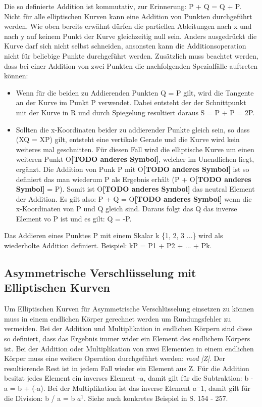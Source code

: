 		Die so definierte Addition ist kommutativ, zur Erinnerung: P + Q = Q + P. Nicht für alle elliptischen Kurven kann eine Addition von Punkten durchgeführt werden. Wie oben bereits erwähnt dürfen die partiellen Ableitungen nach x und nach y auf keinem Punkt der Kurve gleichzeitig null sein. Anders ausgedrückt die Kurve darf sich nicht selbst schneiden, ansonsten kann die Additionsoperation nicht für beliebige Punkte durchgeführt werden.
		Zusätzlich muss beachtet werden, dass bei einer Addition von zwei Punkten die nachfolgenden Spezialfälle auftreten können\cite{Information:und:Kommunikation}:
		
		\begin{itemize}
			\item Wenn für die beiden zu Addierenden Punkten Q = P gilt, wird die Tangente an der Kurve im Punkt P verwendet. Dabei entsteht der der Schnittpunkt mit der Kurve in R und durch Spiegelung resultiert daraus S = P + P = 2P.
			\item Sollten die x-Koordinaten beider zu addierender Punkte gleich sein, so dass (XQ = XP) gilt, entsteht eine vertikale Gerade und die Kurve wird kein weiteres mal geschnitten. Für diesen Fall wird die elliptische Kurve um einen weiteren Punkt O\textbf{[TODO anderes Symbol]}, welcher im Unendlichen liegt, ergänzt. Die Addition von Punk P mit O\textbf{[TODO anderes Symbol]} ist so definiert das man wiederum P als Ergebnis erhält (P + O\textbf{[TODO anderes Symbol]} = P). Somit ist O\textbf{[TODO anderes Symbol]} das neutral Element der Addition. Es gilt also: P + Q = O\textbf{[TODO anderes Symbol]} wenn die x-Koordinaten von P und Q gleich sind. Daraus folgt das Q das inverse Element vo P ist und es gilt: Q = -P.
		\end{itemize}
		
		Das Addieren eines Punktes P mit einem Skalar k \myin \{1, 2, 3 ...\} wird als wiederholte Addition definiert. Beispiel: kP = P1 + P2 + ... + Pk.
		
	\subsection{Asymmetrische Verschlüsselung mit Elliptischen Kurven}
		Um Elliptischen Kurven für Asymmetrische Verschlüsselung einsetzen zu können muss in einem endlichen Körper gerechnet werden um Rundungsfehler zu vermeiden. Bei der Addition und Multiplikation in endlichen Körpern sind diese so definiert, dass das Ergebnis immer wider ein Element des endlichem Körpers ist. Bei der Addition oder Multiplikation von zwei Elementen in einem endlichen Körper muss eine weitere Operation durchgeführt werden: \textit{mod |Z|}. Der resultierende Rest ist in jedem Fall wieder ein Element aus Z. Für die Addition besitzt jedes Element ein inverses Element -a, damit gilt für die Subtraktion: b - a = b + (-a). Bei der Multiplikation ist das inverse Element $a^-1$, damit gilt für die Division: b / a = b \mycdot $a^1$. Siehe auch konkretes Beispiel in \cite{Information:und:Kommunikation} S. 154 - 257.
		

